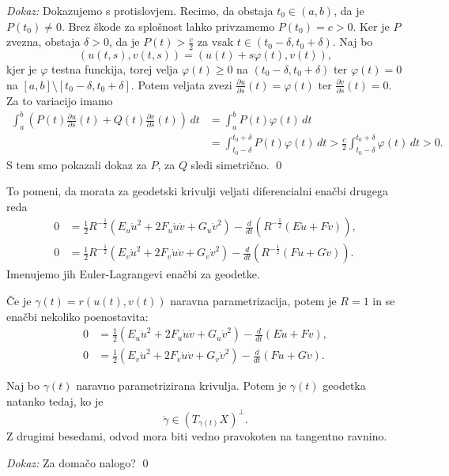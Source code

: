 \noindent
{\em Dokaz:\/}
Dokazujemo s protislovjem. Recimo, da obstaja $t_0 \in (a,b)$, da je $P(t_0) \neq 0$. Brez škode za splošnost lahko privzamemo
$P(t_0) = c > 0$. Ker je $P$ zvezna, obstaja $\delta > 0$, da je $P(t) > \frac{c}{2}$ za vsak $t \in (t_0 - \delta, t_0 + \delta)$. 
Naj bo \begin{equation*}
(u(t,s), v(t,s)) = (u(t) + s \varphi(t), v(t)),
\end{equation*}  
kjer je $\varphi$ testna funckija, torej velja $\varphi(t) \ge 0$ na $(t_0 - \delta, t_0 + \delta)$ ter $\varphi(t) = 0$ na $[a,b] \setminus [t_0 - \delta, t_0 + \delta]$.
Potem veljata zvezi $\frac{ \partial u }{ \partial s }(t)= \varphi(t)$ ter $\frac{ \partial v }{ \partial s }(t) = 0$. Za to variacijo imamo
\begin{align*}
    \int_{a}^{b} (P(t)\frac{ \partial u }{ \partial s } (t) + Q(t)\frac{ \partial v }{ \partial s } (t)  ) \, dt &= \int_{a}^{b} P(t) \varphi(t) \, dt     \\
     &= \int_{t_0 - \delta}^{t_0 + \delta} P(t) \varphi(t)  \, dt > \frac{c}{2}  \int_{t_0 - \delta}^{t_0 + \delta} \varphi(t) \, dt > 0.
\end{align*} 
S tem smo pokazali dokaz za $P$, za $Q$ sledi simetrično.
\qed

To pomeni, da morata za geodetski krivulji veljati diferencialni enačbi drugega reda \begin{align*}
    0 &= \frac{1}{2} R^{-\frac{1}{2}} (E_u \dot{u}^2 + 2F_u \dot{u} \dot{v} + G_u \dot{v}^2) - \frac{d}{dt} (R^{-\frac{1}{2}}(E\dot{u} + F\dot{v})), \\
    0 &= \frac{1}{2} R^{-\frac{1}{2}} (E_v \dot{u}^2 + 2F_v \dot{u} \dot{v} + G_v \dot{v}^2) - \frac{d}{dt} (R^{-\frac{1}{2}}(F\dot{u} + G\dot{v})).
\end{align*}
Imenujemo jih Euler-Lagrangevi enačbi za geodetke.

\begin{opomba}
Če je $\gamma(t) = r(u(t), v(t))$ naravna parametrizacija, potem je $R = 1$ in se enačbi nekoliko poenostavita:
\begin{align*}
    0 &= \frac{1}{2} (E_u \dot{u}^2 + 2F_u \dot{u} \dot{v} + G_u \dot{v}^2) - \frac{d}{dt} (E\dot{u} + F\dot{v}), \\
    0 &= \frac{1}{2} (E_v \dot{u}^2 + 2F_v \dot{u} \dot{v} + G_v \dot{v}^2) - \frac{d}{dt} (F\dot{u} + G\dot{v}).
\end{align*}
\end{opomba}

\begin{izrek}
\label{izr_karakterizacija_geodetke_pri_naravni_parametrizaciji}
 Naj bo $\gamma(t)$ naravno parametrizirana krivulja. Potem je $\gamma(t)$ geodetka natanko tedaj, ko je \begin{equation*}
 \ddot{\gamma} \in (T_{\gamma(t)}X)^{\perp}.
 \end{equation*}  
Z drugimi besedami, odvod mora biti vedno pravokoten na tangentno ravnino.
\end{izrek}
\noindent
{\em Dokaz:\/}
Za domačo nalogo?
\qed